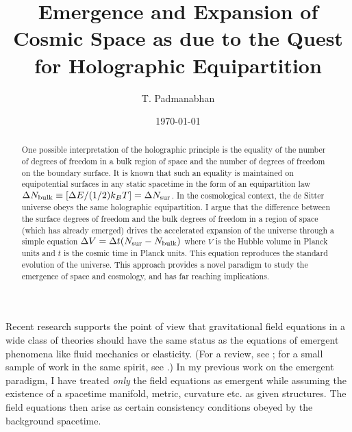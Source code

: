 \documentclass[aps,prd,showpacs,nofootinbib,floats,floatfix,preprintnumbers,groupedaddress,twocolumn]{revtex4}
\begin{document}
\title{Emergence and Expansion of Cosmic Space as due to the Quest for Holographic Equipartition}
\author{T. Padmanabhan}

\date{\today}




  
  
 
  
  \begin{abstract}
One possible interpretation of the holographic principle is the equality of the number of degrees of freedom in a bulk region of space and the number of degrees of freedom on the boundary surface. It is known that such an equality is maintained on equipotential surfaces in any static spacetime in the form of an equipartition law $\Delta N_{\rm bulk}\equiv[\Delta E/ (1/2)k_B T]=  \Delta N_{\rm sur} $. In the cosmological context, the de Sitter universe obeys the same holographic equipartition. I argue that the difference between the surface degrees of freedom and  the bulk degrees of freedom in a region of space (which has already emerged) drives the accelerated expansion of the universe through a simple equation $\Delta V = \Delta t (N_{\rm sur} - N_{\rm bulk})$ where $V$ is the Hubble volume in Planck units and $t$ is the cosmic time in Planck units. 
This equation reproduces the standard evolution of the universe.
This approach provides a novel paradigm to study the emergence of space and cosmology, and has far reaching implications. 
 \end{abstract}

  \maketitle
 
 
 Recent research supports the point of view that gravitational field equations in a wide class of theories should have the same status as the equations of emergent phenomena like fluid mechanics or elasticity. (For a review, see \cite{tp1}; for a small sample of work in the same spirit, see \cite{others}.) In my previous work on the emergent paradigm, I have  treated \textit{only} the field equations as emergent while assuming the existence of a spacetime manifold, metric, curvature etc. as given structures. The field equations then arise as certain consistency conditions obeyed by the background spacetime.
\end{document}
